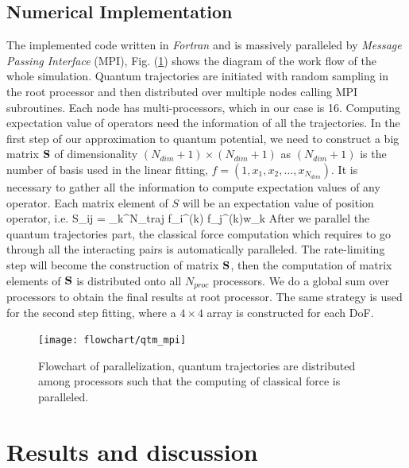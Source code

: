 \documentclass[11pt,letter,nocenter]{revtex4-1}
\begin{document}
\subsection{Numerical Implementation}
The implemented code written in \textit{Fortran} and is massively paralleled by \textit{Message Passing Interface} (MPI), Fig.    (\ref{fig:flowchart}) shows the diagram of the work flow of the whole simulation. Quantum trajectories are initiated with random sampling in the root processor and then distributed over multiple nodes calling MPI subroutines. Each node has multi-processors, which in our case is 16. Computing expectation value of operators need the information of all the trajectories. In the first step of our approximation to quantum potential, we need to construct a big matrix $\bf S$ of dimensionality $(N_{dim}+1 )\times ( N_{dim}+1)$ as $(N_{dim}+1)$  is the number of basis used in the linear fitting, $f = (1,x_1,x_2,\dots,x_{N_{dim}}) $.  It is necessary to gather all the information to compute expectation values of any operator.  
Each matrix element of $S$ will be an expectation value of position operator, i.e. 
\be S_{ij} = \sum_k^{N_{traj}} f_i^{(k)} f_j^{(k)}w_k \ee  
 After we parallel the quantum trajectories part, the classical force computation which requires to go through all the interacting pairs is automatically paralleled. The rate-limiting step will become the construction of matrix $\bf S$, then the computation of matrix elements of $\bf S$ is distributed onto all $N_{proc}$ processors. We do a global sum over processors to obtain the final results at root processor. The same strategy is used for the second step fitting, where a $4 \times 4$ array is constructed for each DoF.    

\begin{figure}
	\texttt{[image: flowchart/qtm\_mpi]}
	\caption{Flowchart of parallelization, quantum trajectories are distributed among processors such that the computing of classical force is paralleled. } 
	\label{fig:flowchart}
\end{figure}



\section{Results and discussion}

\end{document}
